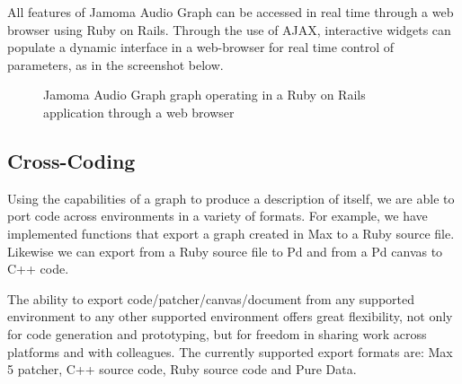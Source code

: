 \documentclass[twoside,a4paper]{article}
\begin{document}
All features of Jamoma Audio Graph can be accessed in real time through a web browser using Ruby on Rails.  Through the use of AJAX, interactive widgets can populate a dynamic interface in a web-browser for real time control of parameters, as in the screenshot below.

\begin{figure}[htbp]
\centerline{}
\caption{Jamoma Audio Graph graph operating in a Ruby on Rails application through a web browser}
\label{fig:rails}
\end{figure}



\subsection{Cross-Coding} %

Using the capabilities of a graph to produce a description of itself, we are able to port code across environments in a variety of formats.  
For example, we have implemented functions that export a graph created in Max to a Ruby source file.  
Likewise we can export from a Ruby source file to Pd and from a Pd canvas to C++ code.  

The ability to export code/patcher/canvas/document from any supported environment to any other supported environment offers great flexibility, not only for code generation and prototyping, but for freedom in sharing work across platforms and with colleagues.  
The currently supported export formats are: Max 5 patcher, C++ source code, Ruby source code and Pure Data.
\end{document}
